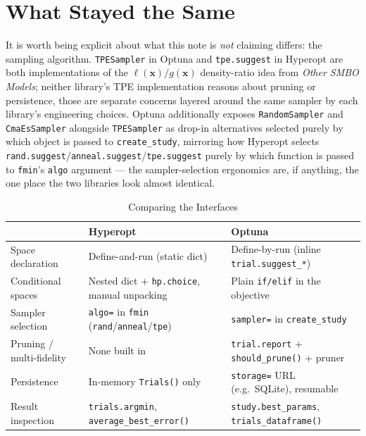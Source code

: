 \documentclass[conference]{IEEEtran}
\begin{document}
\section*{What Stayed the Same}
It is worth being explicit about what this note is \emph{not} claiming differs: the sampling algorithm. \texttt{TPESampler} in Optuna and \texttt{tpe.suggest} in Hyperopt are both implementations of the $\ell(\mathbf{x})/g(\mathbf{x})$ density-ratio idea from \textit{Other SMBO Models}; neither library's TPE implementation reasons about pruning or persistence, those are separate concerns layered around the same sampler by each library's engineering choices. Optuna additionally exposes \texttt{RandomSampler} and \texttt{CmaEsSampler} alongside \texttt{TPESampler} as drop-in alternatives selected purely by which object is passed to \texttt{create\_study}, mirroring how Hyperopt selects \texttt{rand.suggest}/\texttt{anneal.suggest}/\texttt{tpe.suggest} purely by which function is passed to \texttt{fmin}'s \texttt{algo} argument --- the sampler-selection ergonomics are, if anything, the one place the two libraries look almost identical.

\begin{table}[t]
\centering
\caption{Comparing the Interfaces}
\footnotesize
\begin{tabular}{@{}lll@{}}
\toprule
 & Hyperopt & Optuna \\
\midrule
Space declaration & Define-and-run (static dict) & Define-by-run (inline \texttt{trial.suggest\_*}) \\
Conditional spaces & Nested dict + \texttt{hp.choice}, manual unpacking & Plain \texttt{if/elif} in the objective \\
Sampler selection & \texttt{algo=} in \texttt{fmin} (\texttt{rand}/\texttt{anneal}/\texttt{tpe}) & \texttt{sampler=} in \texttt{create\_study} \\
Pruning / multi-fidelity & None built in & \texttt{trial.report} + \texttt{should\_prune()} + pruner \\
Persistence & In-memory \texttt{Trials()} only & \texttt{storage=} URL (e.g.\ SQLite), resumable \\
Result inspection & \texttt{trials.argmin}, \texttt{average\_best\_error()} & \texttt{study.best\_params}, \texttt{trials\_dataframe()} \\
\bottomrule
\end{tabular}
\end{table}
\end{document}
